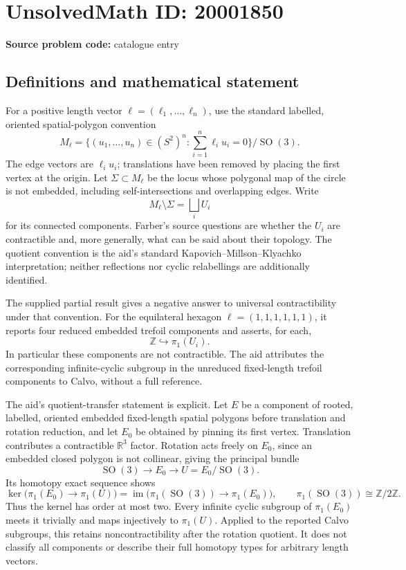 \documentclass[11pt]{article}
\newcommand{\Z}{\mathbb{Z}}
\newcommand{\R}{\mathbb{R}}
\begin{document}
\section*{UnsolvedMath ID: 20001850}
\textbf{Source problem code:} catalogue entry
\subsection{Definitions and mathematical statement}
For a positive length vector \(\ell=(\ell_1,\ldots,\ell_n)\), use the standard labelled, oriented spatial-polygon convention
\[
 M_\ell=\{(u_1,\ldots,u_n)\in(S^2)^n:\sum_{i=1}^n\ell_i u_i=0\}/\operatorname{SO}(3).
\]
The edge vectors are \(\ell_i u_i\); translations have been removed by placing the first vertex at the origin. Let \(\Sigma\subset M_\ell\) be the locus whose polygonal map of the circle is not embedded, including self-intersections and overlapping edges. Write
\[
 M_\ell\setminus\Sigma=\bigsqcup_i U_i
\]
for its connected components. Farber's source questions are whether the \(U_i\) are contractible and, more generally, what can be said about their topology. The quotient convention is the aid's standard Kapovich--Millson--Klyachko interpretation; neither reflections nor cyclic relabellings are additionally identified.

The supplied partial result gives a negative answer to universal contractibility under that convention. For the equilateral hexagon \(\ell=(1,1,1,1,1,1)\), it reports four reduced embedded trefoil components and asserts, for each,
\[
 \Z\hookrightarrow\pi_1(U_i).
\]
In particular these components are not contractible. The aid attributes the corresponding infinite-cyclic subgroup in the unreduced fixed-length trefoil components to Calvo, without a full reference.

The aid's quotient-transfer statement is explicit. Let \(E\) be a component of rooted, labelled, oriented embedded fixed-length spatial polygons before translation and rotation reduction, and let \(E_0\) be obtained by pinning its first vertex. Translation contributes a contractible \(\R^3\) factor. Rotation acts freely on \(E_0\), since an embedded closed polygon is not collinear, giving the principal bundle
\[
 \operatorname{SO}(3)\longrightarrow E_0\longrightarrow U=E_0/\operatorname{SO}(3).
\]
Its homotopy exact sequence shows
\[
 \ker\bigl(\pi_1(E_0)\to\pi_1(U)\bigr)
 =\operatorname{im}\bigl(\pi_1(\operatorname{SO}(3))\to\pi_1(E_0)\bigr),
 \qquad \pi_1(\operatorname{SO}(3))\cong\Z/2\Z.
\]
Thus the kernel has order at most two. Every infinite cyclic subgroup of \(\pi_1(E_0)\) meets it trivially and maps injectively to \(\pi_1(U)\). Applied to the reported Calvo subgroups, this retains noncontractibility after the rotation quotient. It does not classify all components or describe their full homotopy types for arbitrary length vectors.
\end{document}
